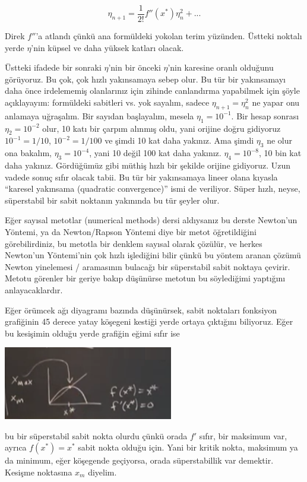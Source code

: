 \documentclass[12pt,fleqn]{article}\usepackage{../../common}
\begin{document}
$$ \eta_{n+1} =\frac{1}{2!} f''(x^*)\eta_n^2 + ... $$

Direk $f''$'a atlandı çünkü ana formüldeki yokolan terim yüzünden. Üstteki
noktalı yerde $\eta$'nin küpsel ve daha yüksek katları olacak.

Üstteki ifadede bir sonraki $\eta$'nin bir önceki $\eta$'nin karesine oranlı
olduğunu görüyoruz. Bu çok, çok hızlı yakınsamaya sebep olur. Bu tür bir
yakınsamayı daha önce irdelememiş olanlarınız için zihinde canlandırma
yapabilmek için şöyle açıklayayım: formüldeki sabitleri vs. yok sayalım, sadece
$\eta_{n+1} = \eta_n^2$ ne yapar onu anlamaya uğraşalım. Bir sayıdan başlayalım,
mesela $\eta_1 = 10^{-1}$. Bir hesap sonrası $\eta_2 = 10^{-2}$ olur, 10 katı bir
çarpım alınmış oldu, yani orijine doğru gidiyoruz $10^{-1} = 1/10$,
$10^{-2}=1/100$ ve şimdi 10 kat daha yakınız. Ama şimdi $\eta_3$ ne olur ona
bakalım, $\eta_3 = 10^{-4}$, yani 10 değil 100 kat daha yakınız. $\eta_4 =
10^{-8}$, 10 bin kat daha yakınız. Gördüğümüz gibi müthiş hızlı bir şekilde
orijine gidiyoruz. Uzun vadede sonuç sıfır olacak tabii. Bu tür bir yakınsamaya
lineer olana kıyasla ``karesel yakınsama (quadratic convergence)'' ismi de
veriliyor. Süper hızlı, neyse, süperstabil bir sabit noktanın yakınında bu tür
şeyler olur.

Eğer sayısal metotlar (numerical methods) dersi aldıysanız bu derste Newton'un
Yöntemi, ya da Newton/Rapson Yöntemi diye bir metot öğretildiğini
görebilirdiniz, bu metotla bir denklem sayısal olarak çözülür, ve herkes
Newton'un Yöntemi'nin çok hızlı işlediğini bilir çünkü bu yöntem aranan çözümü
Newton yinelemesi / aramasının bulacağı bir süperstabil sabit noktaya
çevirir. Metotu görenler bir geriye bakıp düşünürse metotun bu söylediğimi
yaptığını anlayacaklardır.

Eğer örümcek ağı diyagramı bazında düşünürsek, sabit noktaları fonksiyon
grafiğinin 45 derece yatay köşegeni kestiği yerde ortaya çıktığını
biliyoruz. Eğer bu kesişimin olduğu yerde grafiğin eğimi sıfır ise

\includegraphics[width=20em]{21_01.png}

bu bir süperstabil sabit nokta olurdu çünkü orada $f'$ sıfır, bir maksimum var,
ayrıca $f(x^*)=x^*$ sabit nokta olduğu için. Yani bir kritik nokta, maksimum ya
da minimum, eğer köşegende geçiyorsa, orada süperstabillik var demektir. Kesişme
noktasına $x_m$ diyelim. 
\end{document}
